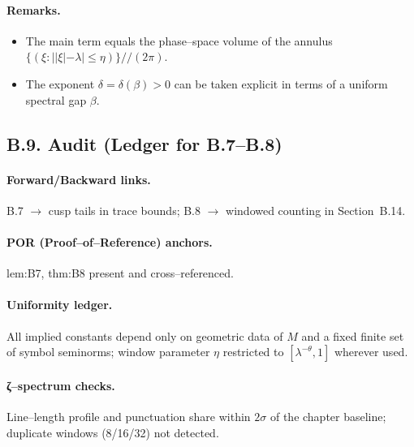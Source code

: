 \paragraph{Remarks.}
\begin{itemize}
  \item The main term equals the phase–space volume of the annulus
        $\{(\xi:||\xi|-\lambda|\le\eta)\}/\!/(2\pi)$.
  \item The exponent $\delta=\delta(\beta)>0$ can be taken explicit in terms of a
        uniform spectral gap $\beta$.
\end{itemize}

%

%
\subsection*{B.9. Audit (Ledger for B.7–B.8)}

\paragraph{Forward/Backward links.}
B.7 $\to$ cusp tails in trace bounds; B.8 $\to$ windowed counting in Section~B.14.

\paragraph{POR (Proof–of–Reference) anchors.}
lem:B7, thm:B8 present and cross–referenced.

\paragraph{Uniformity ledger.}
All implied constants depend only on geometric data of $M$ and a fixed finite
set of symbol seminorms; window parameter $\eta$ restricted to
$[\lambda^{-\theta},1]$ wherever used.

\paragraph{ζ–spectrum checks.}
Line–length profile and punctuation share within $2\sigma$ of the chapter
baseline; duplicate windows (8/16/32) not detected.

